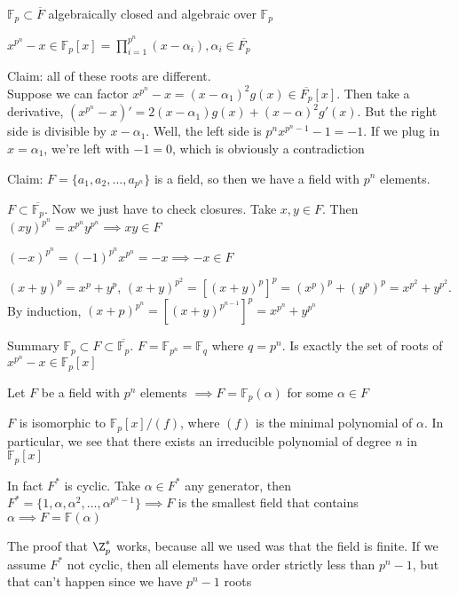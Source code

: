 \documentclass[10pt]{article}
\newcommand{\F}{\mathbb{F}}
\begin{document}
\begin{cor}
    $\F_p \subset \overline{F}$ algebraically closed and algebraic over $\F_p$
\end{cor}

$x^{p^n} - x \in \F_p[x] = \prod\limits_{i = 1}^{p^n}(x - \alpha_i), \alpha_i \in \overline{F_p}$

Claim: all of these roots are different.\\
Suppose we can factor $x^{p^n} - x = (x - \alpha_1)^2g(x) \in \overline{F_p}[x]$. Then take a derivative, $(x^{p^n} - x)' = 2(x - \alpha_1)g(x) + (x -\alpha)^2g'(x)$. But the right side is divisible by $x-\alpha_1$. Well, the left side is $p^nx^{p^n - 1} - 1 = -1$. If we plug in $x = \alpha_1$, we're left with $-1 = 0$, which is obviously a contradiction

Claim: $F = \{a_1, a_2, \ldots, a_{p^n}\}$ is a field, so then we have a field with $p^n$ elements.

$F \subset \overline{\F_p}$. Now we just have to check closures. Take $x, y \in F$. Then $(xy)^{p^n} = x^{p^n}y^{p^n} \implies xy \in F$

$(-x)^{p^n} = (-1)^{p^n}x^{p^n} = -x \implies -x \in F$

$(x + y)^p = x^p + y^p$, $(x + y)^{p^2} = [(x + y)^p]^p = (x^p)^p + (y^p)^p = x^{p^2} + y^{p^2}$. By induction, $(x + p)^{p^n} = [(x + y)^{p^{n-1}}]^p = x^{p^n} + y^{p^n}$

Summary $\F_p \subset F \subset \overline{\F_p}$. $F = \F_{p^n} = \F_q$ where $q = p^n$. Is exactly the set of roots of $x^{p^n} - x \in \F_p[x]$

\begin{thm}
    Let $F$ be a field with $p^n$ elements $\implies F = \F_p(\alpha)$ for some $\alpha \in F$
\end{thm}

\begin{cor}
    $F$ is isomorphic to $\F_p[x]/(f)$, where $(f)$ is the minimal polynomial of $\alpha$. In particular, we see that there exists an irreducible polynomial of degree $n$ in $\F_p[x]$
\end{cor}

In fact $F^*$ is cyclic. Take $\alpha \in F^*$ any generator, then $F^* = \{1, \alpha, \alpha^2, \ldots, \alpha^{p^n - 1}\} \implies F$ is the smallest field that contains $\alpha \implies F = \F(\alpha)$

The proof that $\Z_p^*$ works, because all we used was that the field is finite. If we assume $F^*$ not cyclic, then all elements have order strictly less than $p^n - 1$, but that can't happen since we have $p^n - 1$ roots
\end{document}
